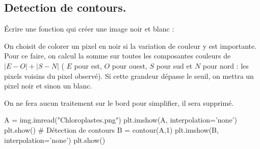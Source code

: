 \documentclass[french,11pt,twoside]{VcCours}
\begin{document}
\subsection{Detection de contours.}
\begin{Exercice}
Écrire une fonction  qui créer une image noir et blanc :

On choisit de colorer un pixel en noir si la variation de couleur y est
importante. Pour ce faire, on calcul la somme sur toutes les composantes couleurs de  
$|E−O|+|S−N|$  ( $E$  pour est,  $O$  pour ouest,  $S$  pour sud et 
$N$ pour nord : les pixels voisins du pixel observé). Si cette grandeur dépasse
le seuil, on mettra un pixel noir et sinon un blanc.

On ne fera aucun traitement sur le bord pour simplifier, il sera supprimé.
\end{Exercice}

\begin{PY}
A = img.imread("Chloroplastes.png")
plt.imshow(A, interpolation='none')
plt.show()
# Détection de contours
B = contour(A,1)
plt.imshow(B, interpolation='none')
plt.show()
\end{PY}
\end{document}
